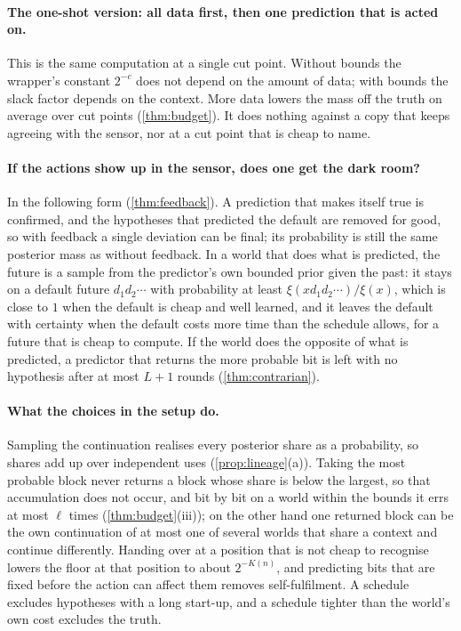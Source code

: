 \paragraph{The one-shot version: all data first, then one prediction that is acted on.} This is the same
computation at a single cut point. Without bounds the wrapper's constant $2^{-c}$ does not depend on the
amount of data; with bounds the slack factor depends on the context. More data lowers the mass off the truth
on average over cut points (\cref{thm:budget}). It does nothing against a copy that keeps agreeing with the
sensor, nor at a cut point that is cheap to name.

\paragraph{If the actions show up in the sensor, does one get the dark room?} In the following form
(\cref{thm:feedback}). A prediction that makes itself true is confirmed, and the hypotheses that predicted the
default are removed for good, so with feedback a single deviation can be final; its probability is still the
same posterior mass as without feedback. In a world that does what is predicted, the future is a sample from
the predictor's own bounded prior given the past: it stays on a default future $d_1d_2\cdots$ with
probability at least $\xi(xd_1d_2\cdots)/\xi(x)$, which is close to $1$ when the default is cheap and well
learned, and it leaves the default with certainty when the default costs more time than the schedule allows,
for a future that is cheap to compute. If the world does the opposite of what is predicted, a predictor that
returns the more probable bit is left with no hypothesis after at most $L+1$ rounds (\cref{thm:contrarian}).

\paragraph{What the choices in the setup do.} Sampling the continuation realises every posterior share as a
probability, so shares add up over independent uses (\cref{prop:lineage}(a)). Taking the most probable block
never returns a block whose share is below the largest, so that accumulation does not occur, and bit by bit
on a world within the bounds it errs at most $\ell$ times (\cref{thm:budget}(iii)); on the other hand one
returned block can be the own continuation of at most one of several worlds that share a context and continue
differently. Handing over at a position that is not cheap to recognise lowers the floor at that position to
about $2^{-K(n)}$, and predicting bits that are fixed before the action can affect them removes
self-fulfilment. A schedule excludes hypotheses with a long start-up, and a schedule tighter than the world's
own cost excludes the truth.

